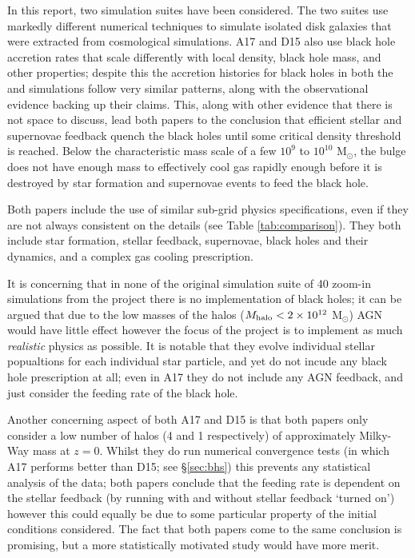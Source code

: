 In this report, two simulation suites have been considered. The two suites use
markedly different numerical techniques to simulate isolated disk galaxies
that were extracted from cosmological simulations. A17 and D15 also use
black hole accretion rates that scale differently with local density, black
hole mass, and other properties; despite this the accretion histories for
black holes in both the \fire{} and \hagn{} simulations follow very similar
patterns, along with the observational evidence backing up their claims.
This, along with other evidence that there is not space to discuss,
lead both papers to the conclusion that efficient stellar and supernovae
feedback quench the black holes until some critical density threshold is
reached. Below the characteristic mass scale of a few $10^9$ to $10^{10}$
M$_\odot$, the bulge does not have enough mass to effectively cool gas rapidly
enough before it is destroyed by star formation and supernovae events to
feed the black hole.

Both papers include the use of similar sub-grid physics specifications, even if
they are not always consistent on the details (see Table \ref{tab:comparison}).
They both include star formation, stellar feedback, supernovae, black holes
and their dynamics, and a complex gas cooling prescription.

It is concerning that in none of the original simulation suite of 40 zoom-in
simulations from the \fire{} project there is no implementation of black holes;
it can be argued that due to the low masses of the halos ($M_{\rm halo} < 2
\times 10^{12}$ M$_\odot$) AGN would have little effect \citep[see e.g.][and
citations]{bower_breaking_2006} however the focus of the \fire{} project is to
implement as much \emph{realistic} physics as possible. It is notable that they
evolve individual stellar popualtions for each individual star particle, and
yet do not incude any black hole prescription at all; even in A17 they do not
include any AGN feedback, and just consider the feeding rate of the black hole.

Another concerning aspect of both A17 and D15 is that both papers only consider
a low number of halos (4 and 1 respectively) of approximately Milky-Way mass at
$z=0$. Whilst they do run numerical convergence tests (in which A17 performs
better than D15; see §\ref{sec:bhs}) this prevents any statistical analysis of
the data; both papers conclude that the feeding rate is dependent on the
stellar feedback (by running with and without stellar feedback `turned on')
however this could equally be due to some particular property of the initial
conditions considered. The fact that both papers come to the same conclusion is
promising, but a more statistically motivated study would have more merit.

